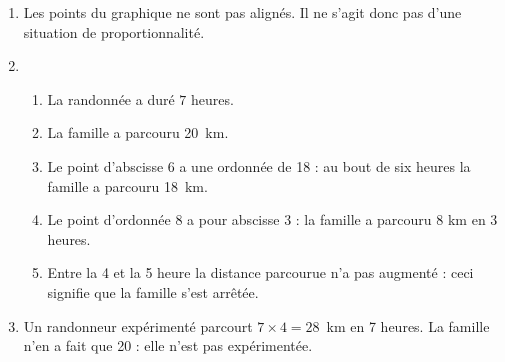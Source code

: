 
\medskip

\begin{enumerate}
\item Les points du graphique ne sont pas alignés. Il ne s'agit donc pas d'une situation de proportionnalité.
\item 
	\begin{enumerate}
		\item La randonnée a duré  $7$ heures.
		\item La famille a parcouru 20~km.
		\item Le point d'abscisse 6 a une ordonnée de 18 : au bout de six heures la famille a parcouru 18~km.
		\item Le point d'ordonnée 8 a pour abscisse 3 : la famille a parcouru 8 km en 3 heures.
		\item Entre la 4 et la 5 heure la distance parcourue n'a pas augmenté : ceci signifie que la famille s'est arrêtée.		
	\end{enumerate}
\item Un randonneur expérimenté parcourt $7 \times 4 = 28$~km en 7 heures. La famille n'en a fait que 20 : elle n'est pas expérimentée.
\end{enumerate}

\vspace{0,5cm}

